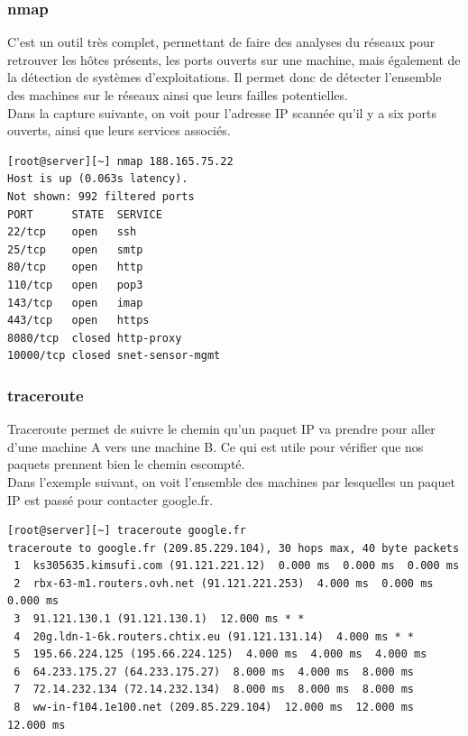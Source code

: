 \documentclass[12pt,a4paper,notitlepage]{article}
\begin{document}
\subsubsection{nmap}
C'est un outil très complet, permettant de faire des analyses du réseaux pour retrouver les hôtes présents, les ports ouverts sur une machine, mais également de la détection de systèmes d'exploitations. Il permet donc de détecter l'ensemble des machines sur le réseaux ainsi que leurs failles potentielles.\\

\noindent Dans la capture suivante, on voit pour l'adresse IP scannée qu'il y a six ports ouverts, ainsi que leurs services associés.

{\footnotesize \begin{verbatim}
[root@server][~] nmap 188.165.75.22
Host is up (0.063s latency).
Not shown: 992 filtered ports
PORT      STATE  SERVICE
22/tcp    open   ssh
25/tcp    open   smtp
80/tcp    open   http
110/tcp   open   pop3
143/tcp   open   imap
443/tcp   open   https
8080/tcp  closed http-proxy
10000/tcp closed snet-sensor-mgmt
\end{verbatim}}

\subsubsection{traceroute}

Traceroute permet de suivre le chemin qu'un paquet IP va prendre pour aller d'une machine A vers une machine B. Ce qui est utile pour vérifier que nos paquets prennent bien le chemin escompté. \\

Dans l'exemple suivant, on voit l'ensemble des machines par lesquelles un paquet IP est passé pour contacter google.fr.

{\footnotesize \begin{verbatim}
[root@server][~] traceroute google.fr
traceroute to google.fr (209.85.229.104), 30 hops max, 40 byte packets
 1  ks305635.kimsufi.com (91.121.221.12)  0.000 ms  0.000 ms  0.000 ms
 2  rbx-63-m1.routers.ovh.net (91.121.221.253)  4.000 ms  0.000 ms  0.000 ms
 3  91.121.130.1 (91.121.130.1)  12.000 ms * *
 4  20g.ldn-1-6k.routers.chtix.eu (91.121.131.14)  4.000 ms * *
 5  195.66.224.125 (195.66.224.125)  4.000 ms  4.000 ms  4.000 ms
 6  64.233.175.27 (64.233.175.27)  8.000 ms  4.000 ms  8.000 ms
 7  72.14.232.134 (72.14.232.134)  8.000 ms  8.000 ms  8.000 ms
 8  ww-in-f104.1e100.net (209.85.229.104)  12.000 ms  12.000 ms  12.000 ms
\end{verbatim}}
\end{document}
